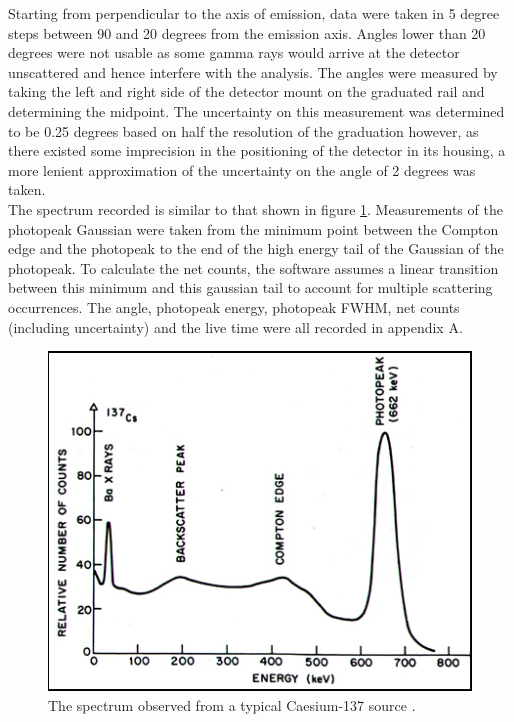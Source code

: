 \documentclass[%
reprint,
amsmath,amssymb,
aps,
floatfix
]{revtex4-2}
\begin{document}
			Starting from perpendicular to the axis of emission, data were taken in 5 degree steps between 90 and 20 degrees from the emission axis. Angles lower than 20 degrees were not usable as some gamma rays would arrive at the detector unscattered and hence interfere with the analysis. The angles were measured by taking the left and right side of the detector mount on the graduated rail and determining the midpoint. The uncertainty on this measurement was determined to be 0.25 degrees based on half the resolution of the graduation however, as there existed some imprecision in the positioning of the detector in its housing, a more lenient approximation of the uncertainty on the angle of 2 degrees was taken.\\
			
			The spectrum recorded is similar to that shown in figure \ref{fig:gammaSpectrum}. Measurements of the photopeak Gaussian were taken from the minimum point between the Compton edge and the photopeak to the end of the high energy tail of the Gaussian of the photopeak. To calculate the net counts, the software assumes a linear transition between this minimum and this gaussian tail to account for multiple scattering occurrences. The angle, photopeak energy, photopeak FWHM, net counts (including uncertainty) and the live time were all recorded in appendix A.
			
			\begin{figure}
				\includegraphics[width=0.85\columnwidth]{gammaspectrum.jpg}
				\caption{\label{fig:gammaSpectrum}The spectrum observed from a typical Caesium-137 source \cite{vcu}.}
			\end{figure}
		
\end{document}
